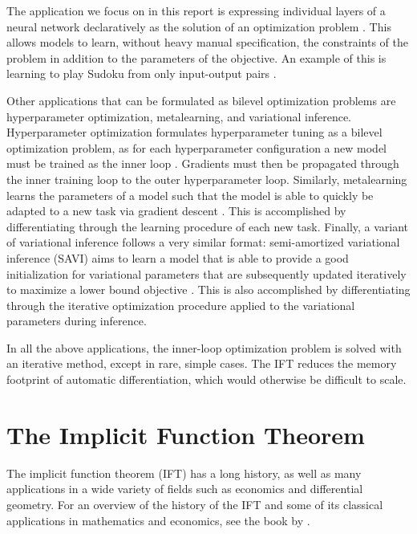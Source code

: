 \documentclass[11pt]{article}
\begin{document}
The application we focus on in this report is expressing individual layers of a neural network declaratively
as the solution of an optimization problem \citep{optnet,agrawal2019diffcvx,gould2019declarative}.
This allows models to learn, without heavy manual specification, the constraints of the problem
in addition to the parameters of the objective.
An example of this is learning to play Sudoku from only input-output pairs \citep{optnet}.

Other applications that can be formulated as bilevel optimization problems are
hyperparameter optimization, metalearning, and variational inference.
Hyperparameter optimization formulates hyperparameter tuning as a bilevel optimization problem,
as for each hyperparameter configuration a new model must be trained as the inner loop
\citep{maclaurin2015reversible,lorraine2019implasso,lorraine2019hoift,bertrand2020implicit}.
Gradients must then be propagated through the inner training loop to the outer hyperparameter
loop.
Similarly, metalearning learns the parameters of a model such that the model is able to quickly
be adapted to a new task via gradient descent \citep{finn2017maml,rajeswaran2019imaml}.
This is accomplished by differentiating through the learning procedure of each new task.
Finally, a variant of variational inference follows a very similar format:
semi-amortized variational inference (SAVI) aims to learn a model that is able to provide
a good initialization for variational parameters that are subsequently updated iteratively
to maximize a lower bound objective \citep{kim2018savi}.
This is also accomplished by differentiating through the iterative optimization procedure
applied to the variational parameters during inference.

In all the above applications, the inner-loop optimization problem is solved
with an iterative method, except in rare, simple cases.
The IFT reduces the memory footprint of automatic differentiation,
which would otherwise be difficult to scale.

\section{The Implicit Function Theorem}
The implicit function theorem (IFT) has a long history, as well as many applications
in a wide variety of fields such as economics and differential geometry.
For an overview of the history of the IFT and some of its classical applications
in mathematics and economics,
see the book by \citet{iftbook}.
\end{document}
